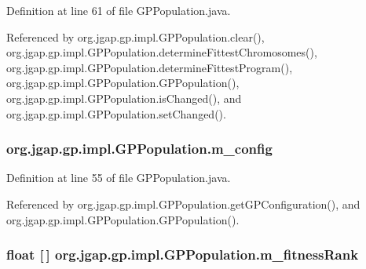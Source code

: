 Definition at line 61 of file G\-P\-Population.\-java.



Referenced by org.\-jgap.\-gp.\-impl.\-G\-P\-Population.\-clear(), org.\-jgap.\-gp.\-impl.\-G\-P\-Population.\-determine\-Fittest\-Chromosomes(), org.\-jgap.\-gp.\-impl.\-G\-P\-Population.\-determine\-Fittest\-Program(), org.\-jgap.\-gp.\-impl.\-G\-P\-Population.\-G\-P\-Population(), org.\-jgap.\-gp.\-impl.\-G\-P\-Population.\-is\-Changed(), and org.\-jgap.\-gp.\-impl.\-G\-P\-Population.\-set\-Changed().

\hypertarget{classorg_1_1jgap_1_1gp_1_1impl_1_1_g_p_population_a54cd610adaf8ce845d6e9ac796f682dc}{
\subsubsection[{m\-\_\-config}]{ org.\-jgap.\-gp.\-impl.\-G\-P\-Population.\-m\-\_\-config\hspace{0.3cm}{\ttfamily [private]}}}\label{classorg_1_1jgap_1_1gp_1_1impl_1_1_g_p_population_a54cd610adaf8ce845d6e9ac796f682dc}


Definition at line 55 of file G\-P\-Population.\-java.



Referenced by org.\-jgap.\-gp.\-impl.\-G\-P\-Population.\-get\-G\-P\-Configuration(), and org.\-jgap.\-gp.\-impl.\-G\-P\-Population.\-G\-P\-Population().

\hypertarget{classorg_1_1jgap_1_1gp_1_1impl_1_1_g_p_population_a7f43165486ff8fd8d69f6c9ad7484823}{
\subsubsection[{m\-\_\-fitness\-Rank}]{\setlength{\rightskip}{0pt plus 5cm}float \mbox{[}$\,$\mbox{]} org.\-jgap.\-gp.\-impl.\-G\-P\-Population.\-m\-\_\-fitness\-Rank\hspace{0.3cm}{\ttfamily [private]}}}\label{classorg_1_1jgap_1_1gp_1_1impl_1_1_g_p_population_a7f43165486ff8fd8d69f6c9ad7484823}


